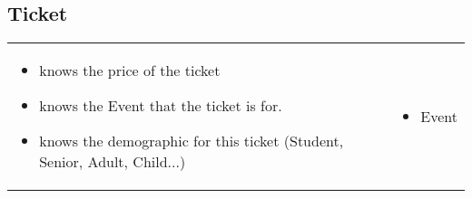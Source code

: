 \documentclass[12pt,titlepage,letterpaper]{article}
\begin{document}
\subsection{Ticket}
\begin{tabular}{p{}|p{}}
\begin{itemize}
\item knows the price of the ticket
\item knows the Event that the ticket is for.
\item knows the demographic for this ticket (Student, Senior, Adult, Child...)
\end{itemize} &
\begin{itemize}
\item Event
\end{itemize}
\end{tabular} 
\end{document}
